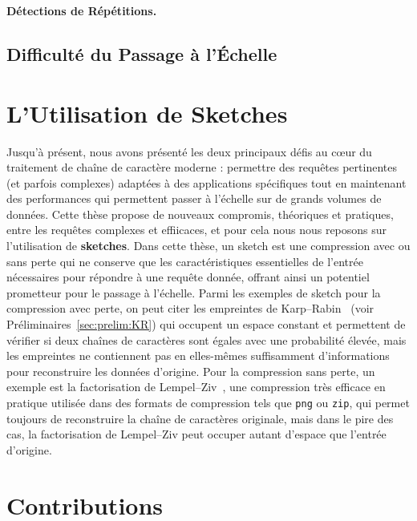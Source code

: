 \noindent\textbf{Détections de Répétitions.}

\subsection*{Difficulté du Passage à l'Échelle}

\section*{L'Utilisation de Sketches}

Jusqu'à présent, nous avons présenté les deux principaux défis au cœur du traitement de chaîne de caractère moderne : permettre des requêtes pertinentes (et parfois complexes) adaptées à des applications spécifiques tout en maintenant des performances qui permettent passer à l'échelle sur de grands volumes de données.
%
Cette thèse propose de nouveaux compromis, théoriques et pratiques, entre les requêtes complexes et effiicaces, et pour cela nous nous reposons sur l'utilisation de \textbf{sketches}.
%
Dans cette thèse, un sketch est une compression avec ou sans perte qui ne conserve que les caractéristiques essentielles de l'entrée nécessaires pour répondre à une requête donnée, offrant ainsi un potentiel prometteur pour le passage à l'échelle. 
Parmi les exemples de sketch pour la compression avec perte, on peut citer les empreintes de Karp--Rabin~\cite{KRfingerprint} (voir Préliminaires~\ref{sec:prelim:KR}) qui occupent un espace constant et permettent de vérifier si deux chaînes de caractères sont égales avec une probabilité élevée, mais les empreintes ne contiennent pas en elles-mêmes suffisamment d'informations pour reconstruire les données d'origine.
Pour la compression sans perte, un exemple est la factorisation de Lempel--Ziv~\cite{ziv1977universal}, une compression très efficace en pratique utilisée dans des formats de compression tels que \texttt{png} ou \texttt{zip}, qui permet toujours de reconstruire la chaîne de caractères originale, mais dans le pire des cas, la factorisation de Lempel--Ziv peut occuper autant d'espace que l'entrée d'origine.

\section*{Contributions}

